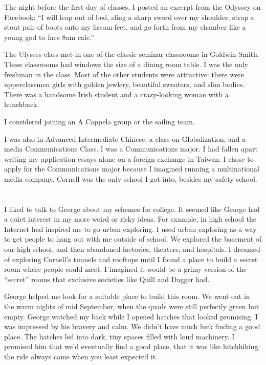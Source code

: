 The night before the first day of classes, I posted an excerpt from the Odyssey
on Facebook: ``I will leap out of bed, sling a sharp sword over my shoulder,
strap a stout pair of boots onto my lissom feet, and go forth from my chamber
like a young god to face 8am calc.''

The Ulysses class met in one of the classic seminar classrooms in
Goldwin-Smith.  These classrooms had windows the size of a dining room table.
I was the only freshman in the class.  Most of the other students were
attractive: there were upperclassmen girls with golden jewlery, beautiful
sweaters, and slim bodies.  There was a handsome Irish student and a
crazy-looking woman with a hunchback. 

I considered joining an A Cappela group or the sailing team.

I was also in Advanced-Intermediate Chinese, a class on Globalization, and a
media Communications Class.  I was a Communications major.  I had fallen apart
writing my application essays alone on a foreign exchange in Taiwan.  I chose
to apply for the Communications major because I imagined running a
multinational media company.  Cornell was the only school I got into, besides my 
safety school.

\section{}

I liked to talk to George about my schemes for college.  It seemed like George
had a quiet interest in my more weird or risky ideas.  For example, in high
school the Internet had inspired me to go urban exploring.  I used urban
exploring as a way to get people to hang out with me outside of school.  We
explored the basement of our high school, and then abandoned factories,
theaters, and hospitals.  I dreamed of exploring Cornell's tunnels and rooftops
until I found a place to build a secret room where people could meet.  I
imagined it would be a grimy version of the ``secret'' rooms that exclusive
societies like Quill and Dagger had. 

George helped me look for a suitable place to build this room.  We went out in
the warm nights of mid September, when the quads were still perfectly green but
empty.  George watched my back while I opened hatches that looked promising.  I
was impressed by his bravery and calm.  We didn't have much luck finding a good
place.  The hatches led into dark, tiny spaces filled with loud machinery.  I
promised him that we'd eventually find a good place, that it was like
hitchhiking: the ride always came when you least expected it.

